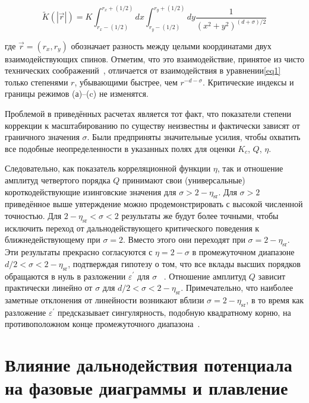 \begin{equation}
	\tilde{K}(|\vec{r}|)=K \int_{r_{x}-(1 / 2)}^{r_{x}+(1 / 2)} d x \int_{r_{y}-(1 / 2)}^{r_{y}+(1 / 2)} d y \frac{1}{\left(x^{2}+y^{2}\right)^{(d+\sigma) / 2}}
\end{equation}

где $\vec r=\left(r_{x}, r_{y}\right)$ обозначает разность между целыми координатами двух взаимодействующих спинов. 
Отметим, что это взаимодействие, принятое из чисто технических соображений~\cite{10.1142/S0129183195000265}, отличается от взаимодействия в уравнении\ref{eq1} только степенями $r$, убывающими быстрее, чем $r^{-d-\sigma}$.
Критические индексы и границы режимов (а)–(c) не изменятся.

Проблемой в приведённых расчетах является тот факт, что показатели степени коррекции к масштабированию по существу неизвестны и фактически зависят от граничного значения $\sigma$. 
Были предприняты значительные усилия, чтобы охватить все подобные неопределенности в указанных полях для оценки $K_{c}$, $Q$, $\eta$.

Следовательно, как показатель корреляционной функции $\eta$, так и отношение амплитуд четвертого порядка $Q$ принимают свои (универсальные) короткодействующие изинговские значения для $\sigma>2-\eta_{\mathrm{sr}}$. 
Для $\sigma>2$ приведённое выше увтерждение можно продемонстрировать с высокой численной точностью. Для $2-\eta_{\mathrm{sr}}<\sigma<2$ результаты же будут более точными, чтобы исключить переход от дальнодействующего критического поведения к ближнедействующему при $\sigma=2$.
Вместо этого они переходят при $\sigma=2-\eta_{\mathrm{sr}}$. 
Эти результаты прекрасно согласуются с $\eta=2-\sigma$ в промежуточном диапазоне $d/2<\sigma<2-\eta_{\mathrm{sr}}$, подтверждая гипотезу о том, что все вклады высших порядков обращаются в нуль в разложении $\varepsilon^{\prime}$ для $\sigma$ ~\cite{10.1103/PhysRevLett.29.917}.
Отношение амплитуд $Q$ зависит практически линейно от $\sigma$ для $d/2<\sigma<2-\eta_{\mathrm{sr}}$.
Примечательно, что наиболее заметные отклонения от линейности возникают вблизи $\sigma=2-\eta_{\mathrm{sr}}$, в то время как разложение $\varepsilon^{\prime}$ предсказывает сингулярность, подобную квадратному корню, на противоположном конце промежуточного диапазона~\cite{10.1103/PhysRevE.60.7558}.


\section{Влияние дальнодействия потенциала на фазовые диаграммы и плавление}

